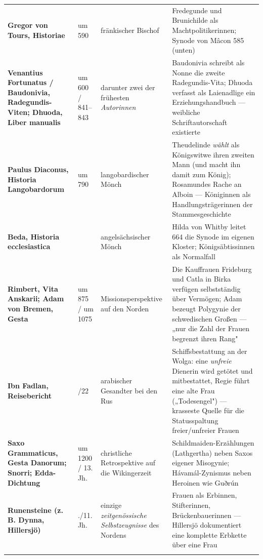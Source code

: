 \documentclass[11pt,a4paper,ngerman]{scrartcl}
\begin{document}
\begin{small}
\begin{longtable}{>{\raggedright\arraybackslash}p{}>{\raggedright\arraybackslash}p{}>{\raggedright\arraybackslash}p{}>{\raggedright\arraybackslash}p{}}
\addlinespace[2pt]
\textbf{Gregor von Tours, Historiae} & um 590 & fränkischer Bischof & Fredegunde und Brunichilde als Machtpolitikerinnen; Synode von Mâcon 585 (unten) \\
\addlinespace[2pt]
\textbf{Venantius Fortunatus / \textbf{Baudonivia}, Radegundis-Viten; \textbf{Dhuoda}, Liber manualis} & um 600 / 841–843 & darunter zwei der frühesten \emph{Autorinnen} & Baudonivia schreibt als Nonne die zweite Radegundis-Vita; Dhuoda verfasst als Laienadlige ein Erziehungshandbuch — weibliche Schriftautorschaft existierte \\
\addlinespace[2pt]
\textbf{Paulus Diaconus, Historia Langobardorum} & um 790 & langobardischer Mönch & Theudelinde \emph{wählt} als Königswitwe ihren zweiten Mann (und macht ihn damit zum König); Rosamundes Rache an Alboin — Königinnen als Handlungsträgerinnen der Stammesgeschichte \\
\addlinespace[2pt]
\textbf{Beda, Historia ecclesiastica} & 731 & angelsächsischer Mönch & Hilda von Whitby leitet 664 die Synode im eigenen Kloster; Königsäbtissinnen als Normalfall \\
\addlinespace[2pt]
\textbf{Rimbert, Vita Anskarii; Adam von Bremen, Gesta} & um 875 / um 1075 & Missionsperspektive auf den Norden & Die Kauffrauen Frideburg und Catla in Birka verfügen selbstständig über Vermögen; Adam bezeugt Polygynie der schwedischen Großen — „nur die Zahl der Frauen begrenzt ihren Rang" \\
\addlinespace[2pt]
\textbf{\textbf{Ibn Fadlan}, Reisebericht} & 921/22 & arabischer Gesandter bei den Rus & Schiffsbestattung an der Wolga: eine \emph{unfreie} Dienerin wird getötet und mitbestattet, Regie führt eine alte Frau („Todesengel") — krasseste Quelle für die Statusspaltung freier/unfreier Frauen \\
\addlinespace[2pt]
\textbf{Saxo Grammaticus, Gesta Danorum; Snorri; Edda-Dichtung} & um 1200 / 13. Jh. & christliche Retrospektive auf die Wikingerzeit & Schildmaiden-Erzählungen (Lathgertha) neben Saxos eigener Misogynie; Hávamál-Zynismus neben Heroinen wie Guðrún \\
\addlinespace[2pt]
\textbf{\textbf{Runensteine} (z. B. Dynna, Hillersjö)} & 10./11. Jh. & einzige \emph{zeitgenössische Selbstzeugnisse} des Nordens & Frauen als Erbinnen, Stifterinnen, Brückenbauerinnen — Hillersjö dokumentiert eine komplette Erbkette über eine Frau \\
\addlinespace[2pt]
\bottomrule
\end{longtable}
\end{small}
\end{document}
